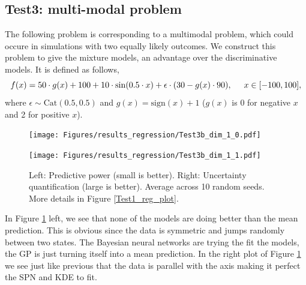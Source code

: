 \subsection*{Test3: multi-modal problem}
The following problem is corresponding to a multimodal problem, which could occure in simulations with
two equally likely outcomes. We construct this problem to give the mixture models, 
an advantage over the discriminative models. It is defined as follows, 
$$f(x) = 50\cdot g(x)+ 100 + 10\cdot \sin(0.5\cdot x) + \epsilon \cdot (30 - g(x) \cdot 90), \hspace*{0.5cm}x \in
[-100,100],$$ 
where $\epsilon \sim \text{Cat}(0.5,0.5)$ and $g(x) = \text{sign}(x)+1$
($g(x)$ is 0 for negative $x$ and 2 for positive $x$).

\begin{figure}[bth]
  \centering
  \begin{minipage}[b]{0.49\textwidth}
   \texttt{[image: Figures/results\_regression/Test3b\_dim\_1\_0.pdf]}
  \end{minipage}
  \hfill
  \begin{minipage}[b]{0.49\textwidth}
    \texttt{[image: Figures/results\_regression/Test3b\_dim\_1\_1.pdf]}
   \end{minipage}
  \caption{Left: Predictive power (small is better). Right: Uncertainty quantification (large is
  better). Average across 10 random seeds. More details in Figure \ref{Test1_reg_plot}.}
  \label{Test3_reg_plot}
\end{figure}

In Figure \ref{Test3_reg_plot} left, we see that none of the models are doing better than the mean
prediction. This is obvious since the data is symmetric and jumps randomly between two states. The
Bayesian neural networks are trying the fit the models, the GP is just turning itself into a mean
prediction. In the right plot of Figure \ref{Test3_reg_plot} we see just like previous that the data
is parallel with the axis making it perfect the SPN and KDE to fit. 



